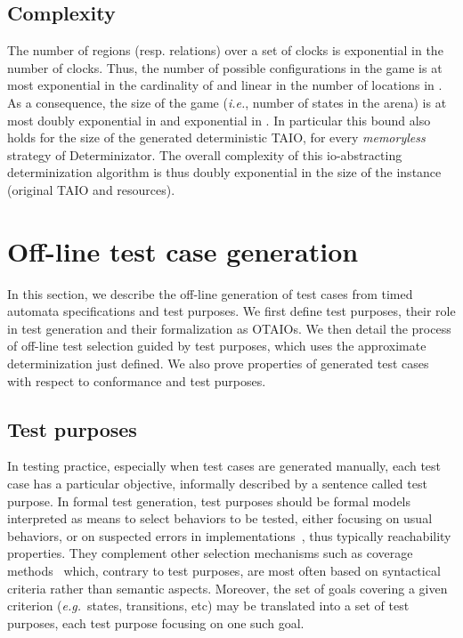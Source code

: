 \documentclass{LMCS}
\theoremstyle{plain}\newtheorem{proposition}[thm]{Proposition}
\def\eg{{\em e.g.}}
\begin{document}
\subsection*{Complexity} The number of regions (resp. relations)
  over a set of clocks is exponential in the number of clocks. Thus,
  the number of possible configurations in the game is at most exponential in the
  cardinality of  and linear in the number of locations in
  . As a consequence, the size of the game (\emph{i.e.}, number of
  states in the arena) is at most doubly exponential in 
  and exponential in . In particular this bound also holds
  for the size of the generated deterministic TAIO, for every
  \emph{memoryless} strategy of Determinizator. The overall complexity
  of this io-abstracting determinization algorithm is thus doubly
  exponential in the size of the instance (original TAIO and
  resources).


\section{Off-line test case generation}
\label{sec-generation}
In this section, we describe the off-line generation of test cases from 
timed automata specifications and test purposes.
We first define test purposes, their role in test generation 
and their formalization as OTAIOs.
We then detail the process of
off-line test selection guided by test purposes, which uses 
the approximate determinization just defined.
We also prove properties of generated test cases with respect 
to conformance and test purposes.

\subsection{Test purposes}

In testing practice, especially when test cases are
generated manually, each test case has a particular objective,
informally described by a sentence called test purpose.
In formal test generation, test purposes should be formal models 
interpreted as means to select behaviors to be tested,
either focusing on usual behaviors, or on suspected errors in
implementations~\cite{jard04a}, thus typically reachability properties.  
They complement other selection mechanisms 
such as coverage methods~\cite{Zhu-Hall-May-97} which, contrary to test purposes,
are most often based on syntactical criteria rather than semantic aspects.
Moreover, the set of goals
covering a given criterion  (\eg~states, transitions, etc) 
may be translated into a set of test purposes,
each test purpose focusing on one such goal.
\end{document}
